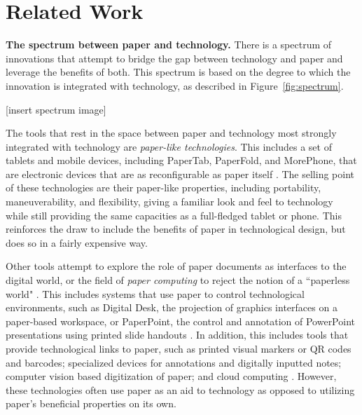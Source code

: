 \documentclass{sig-alternate}
\begin{document}


\section{Related Work}

\textbf{The spectrum between paper and technology.} There is a spectrum of innovations that attempt to bridge the gap between technology and paper and leverage the benefits of both. This spectrum is based on the degree to which the innovation is integrated with technology, as described in Figure~\ref{fig:spectrum}.

[insert spectrum image]



The tools that rest in the space between paper and technology most strongly integrated with technology are \emph{paper-like technologies}. This includes a set of tablets and mobile devices, including PaperTab, PaperFold, and MorePhone, that are electronic devices that are as reconfigurable as paper itself \cite{gomes2014,gomes2013,tarun2013}. The selling point of these technologies are their paper-like properties, including portability, maneuverability, and flexibility, giving a familiar look and feel to technology while still providing the same capacities as a full-fledged tablet or phone. This reinforces the draw to include the benefits of paper in technological design, but does so in a fairly expensive way. 

Other tools attempt to explore the role of paper documents as interfaces to the digital world, or the field of \emph{paper computing} to reject the notion of a ``paperless world" \cite{kaplan2010}. This includes systems that use paper to control technological environments, such as Digital Desk, the projection of graphics interfaces on a paper-based workspace, or PaperPoint, the control and annotation of PowerPoint presentations using printed slide handouts \cite{newman1992,wellner1993,signer2007}. In addition, this includes tools that provide technological links to paper, such as printed visual markers or QR codes and barcodes; specialized devices for annotations and digitally inputted notes; computer vision based digitization of paper; and cloud computing \cite{kaplan2010,anoto,pietrzak2010}. However, these technologies often use paper as an aid to technology as opposed to utilizing paper's beneficial properties on its own. 
\end{document}
